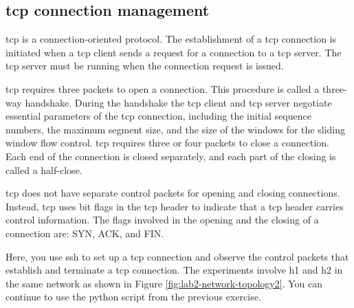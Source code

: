 \newpage
\subsection{\ac{tcp} connection management}

\ac{tcp} is a connection-oriented protocol. The establishment of a \ac{tcp} connection is initiated when a \ac{tcp} client sends a request for a connection to a \ac{tcp} server. The \ac{tcp} server must be running when the connection request is issued.

\ac{tcp} requires three packets to open a connection. This procedure is called a three-way handshake. During the handshake the \ac{tcp} client and \ac{tcp} server negotiate essential parameters of the \ac{tcp} connection, including the initial sequence numbers, the maximum segment size, and the size of the windows for the sliding window flow control. \ac{tcp} requires three or four packets to close a connection. Each end of the connection is closed separately, and each part of the closing is called a half-close.

\ac{tcp} does not have separate control packets for opening and closing connections. Instead, \ac{tcp} uses bit flags in the \ac{tcp} header to indicate that a \ac{tcp} header carries control information. The flags involved in the opening and the closing of a connection are: SYN, ACK, and FIN.

Here, you use ssh to set up a \ac{tcp} connection and observe the control packets that establish and terminate a \ac{tcp} connection. The experiments involve h1 and h2 in the same network as shown in Figure \ref{fig:lab2-network-topology2}. You can continue to use the python script from the previous exercise.

